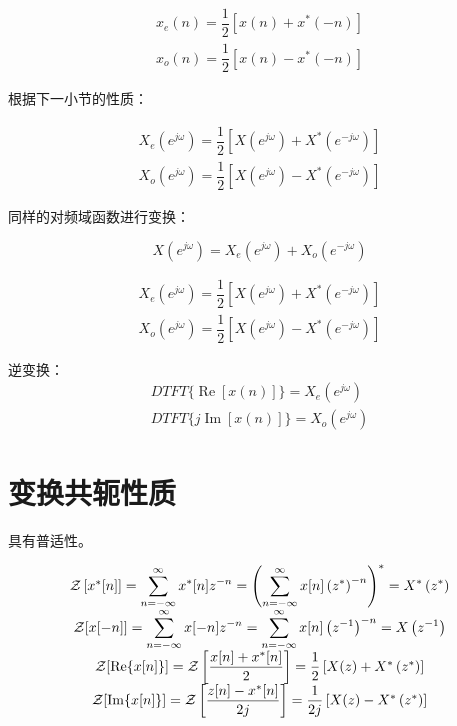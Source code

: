 \documentclass[cn,11pt,chinese,black,simple]{elegantbook}
\begin{document}
\[
\begin{array}{l}
x_{e}(n)=\dfrac{1}{2}\left[x(n)+x^{*}(-n)\right] \\
x_{o}(n)=\dfrac{1}{2}\left[x(n)-x^{*}(-n)\right]
\end{array}
\]

根据下一小节的性质：

\[
\begin{array}{l}
X_{e}\left(e^{j \omega}\right)=\dfrac{1}{2}\left[X\left(e^{j \omega}\right)+X^{*}\left(e^{-j \omega}\right)\right] \\
X_{o}\left(e^{j \omega}\right)=\dfrac{1}{2}\left[X\left(e^{j \omega}\right)-X^{*}\left(e^{-j \omega}\right)\right]
\end{array}
\]

同样的对频域函数进行变换：

\[X(e^{j\omega}) = X_e(e^{j\omega}) + X_o(e^{-j\omega})\] 

\[
\begin{array}{l}
X_{e}\left(e^{j \omega}\right)=\dfrac{1}{2}\left[X\left(e^{j \omega}\right)+X^{*}\left(e^{-j \omega}\right)\right] \\
X_{o}\left(e^{j \omega}\right)=\dfrac{1}{2}\left[X\left(e^{j \omega}\right)-X^{*}\left(e^{-j \omega}\right)\right]
\end{array}
\]

逆变换：
\[
\begin{array}{l}
D T F T\{\operatorname{Re}[x(n)]\}=X_{e}\left(e^{j \omega}\right) \\
D T F T\{j \operatorname{Im}[x(n)]\}=X_{o}\left(e^{j \omega}\right)
\end{array}
\]
\section{变换共轭性质}

具有普适性。

\[
\begin{array}{c}
\mathcal{Z}\left[x^{*}[n]\right]=\displaystyle\sum_{n=-\infty}^{\infty} x^{*}[n] z^{-n}=\left(\displaystyle\sum_{n=-\infty}^{\infty} x[n]\left(z^{*}\right)^{-n}\right)^{*}=X^{*}\left(z^{*}\right) \\
\mathcal{Z}[x[-n]]=\displaystyle\sum_{n=-\infty}^{\infty} x[-n] z^{-n}=\displaystyle\sum_{n=-\infty}^{\infty} x[n]\left(z^{-1}\right)^{-n}=X\left(z^{-1}\right) \\
\mathcal{Z}[\operatorname{Re}\{x[n]\}]=\mathcal{Z}\left[\dfrac{x[n]+x^{*}[n]}{2}\right]=\dfrac{1}{2}\left[X(z)+X^{*}\left(z^{*}\right)\right] \\
\mathcal{Z}[\operatorname{Im}\{x[n]\}]=\mathcal{Z}\left[\dfrac{z[n]-x^{*}[n]}{2 j}\right]=\dfrac{1}{2 j}\left[X(z)-X^{*}\left(z^{*}\right)\right]
\end{array}
\]
\end{document}
